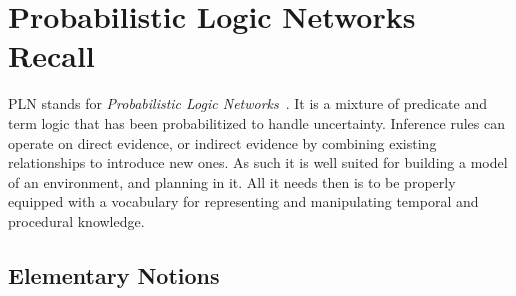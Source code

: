 \documentclass[runningheads]{llncs}
\begin{document}


\section{Probabilistic Logic Networks Recall}
\label{sec:recall}
PLN stands for \emph{Probabilistic Logic
  Networks}~\cite{Goertzel09PLN}.  It is a mixture of predicate and
term logic that has been probabilitized to handle uncertainty.
Inference rules can operate on direct evidence, or indirect evidence
by combining existing relationships to introduce new ones.
As such it is well suited for building a model of an environment, and
planning in it.  All it needs then is to be properly equipped with a
vocabulary for representing and manipulating temporal and procedural
knowledge.

\subsection{Elementary Notions}


%
%
%
\end{document}
